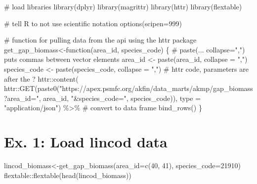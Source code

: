 \documentclass[
  letterpaper,
  oneside,
  open=any]{scrbook}
\newenvironment{Shaded}{\begin{snugshade}}{\end{snugshade}}
\newcommand{\AttributeTok}[1]{\textcolor[rgb]{0.40,0.45,0.13}{#1}}
\newcommand{\CommentTok}[1]{\textcolor[rgb]{0.37,0.37,0.37}{#1}}
\newcommand{\ControlFlowTok}[1]{\textcolor[rgb]{0.00,0.23,0.31}{#1}}
\newcommand{\DecValTok}[1]{\textcolor[rgb]{0.68,0.00,0.00}{#1}}
\newcommand{\FunctionTok}[1]{\textcolor[rgb]{0.28,0.35,0.67}{#1}}
\newcommand{\NormalTok}[1]{\textcolor[rgb]{0.00,0.23,0.31}{#1}}
\newcommand{\OtherTok}[1]{\textcolor[rgb]{0.00,0.23,0.31}{#1}}
\newcommand{\SpecialCharTok}[1]{\textcolor[rgb]{0.37,0.37,0.37}{#1}}
\newcommand{\StringTok}[1]{\textcolor[rgb]{0.13,0.47,0.30}{#1}}
\begin{document}
\begin{Shaded}
\begin{Highlighting}[]
\CommentTok{\# load libraries}
\FunctionTok{library}\NormalTok{(dplyr)}
\FunctionTok{library}\NormalTok{(magrittr)}
\FunctionTok{library}\NormalTok{(httr)}
\FunctionTok{library}\NormalTok{(flextable)}

\CommentTok{\# tell R to not use scientific notation}
\FunctionTok{options}\NormalTok{(}\AttributeTok{scipen=}\DecValTok{999}\NormalTok{)}

\CommentTok{\# function for pulling data from the api using the httr package}
\NormalTok{get\_gap\_biomass}\OtherTok{\textless{}{-}}\ControlFlowTok{function}\NormalTok{(area\_id, species\_code) \{}
  \CommentTok{\# paste(... collapse=",") puts commas between vector elements}
\NormalTok{  area\_id }\OtherTok{\textless{}{-}} \FunctionTok{paste}\NormalTok{(area\_id, }\AttributeTok{collapse =} \StringTok{","}\NormalTok{)}
\NormalTok{  species\_code }\OtherTok{\textless{}{-}} \FunctionTok{paste}\NormalTok{(species\_code, }\AttributeTok{collapse =} \StringTok{","}\NormalTok{)}
  \CommentTok{\# httr code, parameters are after the \textquotesingle{}?\textquotesingle{}}
\NormalTok{  httr}\SpecialCharTok{::}\FunctionTok{content}\NormalTok{(}
\NormalTok{    httr}\SpecialCharTok{::}\FunctionTok{GET}\NormalTok{(}\FunctionTok{paste0}\NormalTok{(}\StringTok{"https://apex.psmfc.org/akfin/data\_marts/akmp/gap\_biomass?area\_id="}\NormalTok{,}
\NormalTok{                     area\_id,}
                     \StringTok{"\&species\_code="}\NormalTok{,}
\NormalTok{                     species\_code)),}
    \AttributeTok{type =} \StringTok{"application/json"}\NormalTok{) }\SpecialCharTok{\%\textgreater{}\%}
    \CommentTok{\# convert to data frame}
    \FunctionTok{bind\_rows}\NormalTok{()}
\NormalTok{\}}
\end{Highlighting}
\end{Shaded}

\hypertarget{ex.-1-load-lincod-data}{%
\section{Ex. 1: Load lincod data}\label{ex.-1-load-lincod-data}}

\begin{Shaded}
\begin{Highlighting}[]
\NormalTok{lincod\_biomass}\OtherTok{\textless{}{-}}\FunctionTok{get\_gap\_biomass}\NormalTok{(}\AttributeTok{area\_id=}\FunctionTok{c}\NormalTok{(}\DecValTok{40}\NormalTok{, }\DecValTok{41}\NormalTok{), }\AttributeTok{species\_code=}\DecValTok{21910}\NormalTok{)}
\NormalTok{flextable}\SpecialCharTok{::}\FunctionTok{flextable}\NormalTok{(}\FunctionTok{head}\NormalTok{(lincod\_biomass))}
\end{Highlighting}
\end{Shaded}
\end{document}
